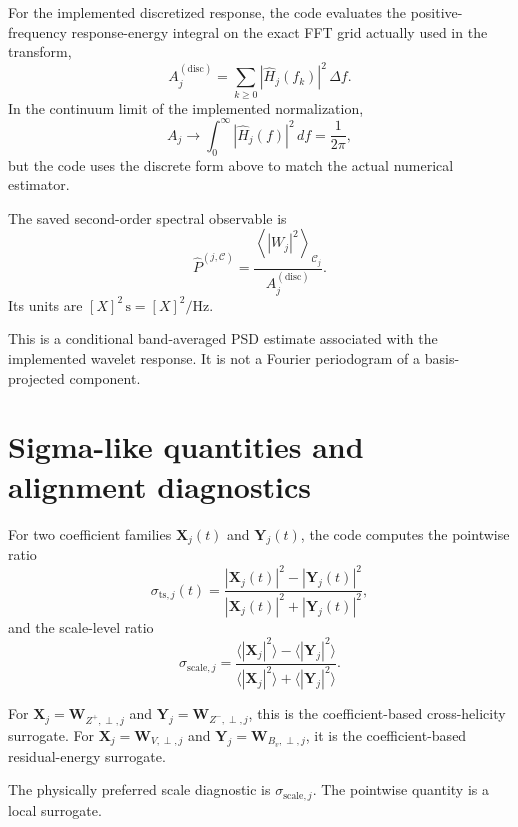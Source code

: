 \documentclass[11pt]{article}
\begin{document}
For the implemented discretized response, the code evaluates the positive-frequency
response-energy integral on the exact FFT grid actually used in the transform,
\begin{equation}
 A_j^{(\mathrm{disc})} = \sum_{k\ge 0} |\widehat{H}_j(f_k)|^2\,\Delta f.
\end{equation}
In the continuum limit of the implemented normalization,
\begin{equation}
 A_j \to \int_0^{\infty}|\widehat{H}_j(f)|^2\,df = \frac{1}{2\pi},
\end{equation}
but the code uses the discrete form above to match the actual numerical estimator.

The saved second-order spectral observable is
\begin{equation}
 \widehat{P}^{(j,\mathcal{C})} = \frac{\left\langle |W_j|^2 \right\rangle_{\mathcal{C}_j}}{A_j^{(\mathrm{disc})}}.
\end{equation}
Its units are $[X]^2\,\mathrm{s} = [X]^2/\mathrm{Hz}$.

This is a conditional band-averaged PSD estimate associated with the implemented
wavelet response. It is not a Fourier periodogram of a basis-projected component.

\section{Sigma-like quantities and alignment diagnostics}

For two coefficient families $\mathbf{X}_j(t)$ and $\mathbf{Y}_j(t)$, the code
computes the pointwise ratio
\begin{equation}
 \sigma_{\mathrm{ts},j}(t) = \frac{|\mathbf{X}_j(t)|^2 - |\mathbf{Y}_j(t)|^2}{|\mathbf{X}_j(t)|^2 + |\mathbf{Y}_j(t)|^2},
\end{equation}
and the scale-level ratio
\begin{equation}
 \sigma_{\mathrm{scale},j} = \frac{\langle |\mathbf{X}_j|^2 \rangle - \langle |\mathbf{Y}_j|^2 \rangle}{\langle |\mathbf{X}_j|^2 \rangle + \langle |\mathbf{Y}_j|^2 \rangle}.
\end{equation}

For $\mathbf{X}_j=\mathbf{W}_{Z^+,\perp,j}$ and $\mathbf{Y}_j=\mathbf{W}_{Z^-,\perp,j}$,
this is the coefficient-based cross-helicity surrogate. For
$\mathbf{X}_j=\mathbf{W}_{V,\perp,j}$ and $\mathbf{Y}_j=\mathbf{W}_{B_v,\perp,j}$, it is
the coefficient-based residual-energy surrogate.

The physically preferred scale diagnostic is $\sigma_{\mathrm{scale},j}$. The
pointwise quantity is a local surrogate.
\end{document}
